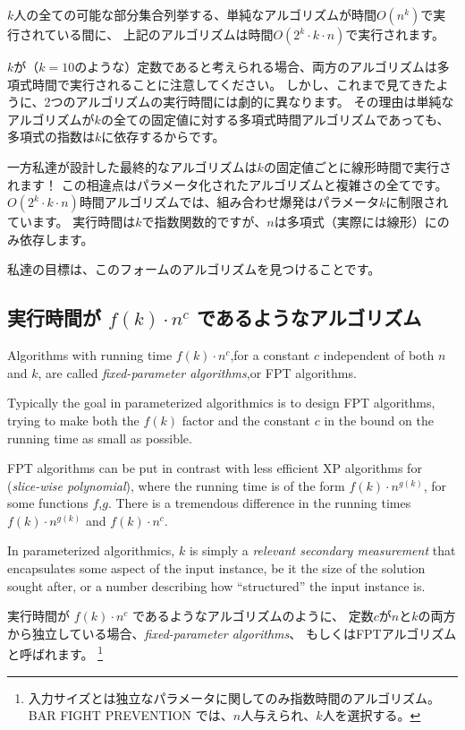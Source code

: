 \documentclass{jsarticle}
\begin{document}
$k$人の全ての可能な部分集合列挙する、単純なアルゴリズムが時間$O(n^k)$で実行されている間に、
上記のアルゴリズムは時間$ O(2^k \cdot k \cdot n)$で実行されます。

$k$が（$k=10$のような）定数であると考えられる場合、両方のアルゴリズムは多項式時間で実行されることに注意してください。
しかし、これまで見てきたように、2つのアルゴリズムの実行時間には劇的に異なります。
その理由は単純なアルゴリズムが$k$の全ての固定値に対する多項式時間アルゴリズムであっても、多項式の指数は$k$に依存するからです。

一方私達が設計した最終的なアルゴリズムは$k$の固定値ごとに線形時間で実行されます！
この相違点はパラメータ化されたアルゴリズムと複雑さの全てです。
$O(2^k \cdot k \cdot n)$時間アルゴリズムでは、組み合わせ爆発はパラメータ$k$に制限されています。
実行時間は$k$で指数関数的ですが、$n$は多項式（実際には線形）にのみ依存します。

私達の目標は、このフォームのアルゴリズムを見つけることです。
\newpage

\subsection{実行時間が $f(k) \cdot n^c$ であるようなアルゴリズム}

\begin{shadebox}
    Algorithms with running time $f(k) \cdot n^c$,for a constant $c$ independent of both $n$ and $k$, are called {\it fixed-parameter algorithms},or FPT algorithms.
    
    Typically the goal in parameterized algorithmics is to design FPT algorithms, 
    trying to make both the $f(k)$ factor and the constant $c$ in the bound on the running time as small as possible.  
 
    FPT algorithms can be put in contrast with less efficient XP algorithms for ({\it slice-wise polynomial}), 
    where the running time is of the form $f(k) \cdot n ^ {g(k)}$, for some functions $f$,$g$. 
    There is a tremendous difference in the running times $f(k) \cdot n ^ {g(k)}$ and $f(k) \cdot n^c$.
    
    In parameterized algorithmics, 
    $k$ is simply a {\it relevant secondary measurement} that 
    encapsulates some aspect of the input instance, 
    be it the size of the solution sought after, 
    or a number describing how “structured” the input instance is.
\end{shadebox}

実行時間が $f(k) \cdot n^c$ であるようなアルゴリズムのように、
定数$c$が$n$と$k$の両方から独立している場合、{\it fixed-parameter algorithms}、
もしくはFPTアルゴリズムと呼ばれます。
\footnote{入力サイズとは独立なパラメータに関してのみ指数時間のアルゴリズム。
\textsc{BAR FIGHT PREVENTION} では、$n$人与えられ、$k$人を選択する。}
\end{document}
